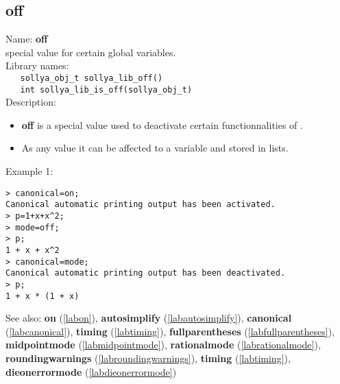 \subsection{off}
\label{laboff}
\noindent Name: \textbf{off}\\
\phantom{aaa}special value for certain global variables.\\[0.2cm]
\noindent Library names:\\
\verb|   sollya_obj_t sollya_lib_off()|\\
\verb|   int sollya_lib_is_off(sollya_obj_t)|\\[0.2cm]
\noindent Description: \begin{itemize}

\item \textbf{off} is a special value used to deactivate certain functionnalities
   of \sollya.

\item As any value it can be affected to a variable and stored in lists.
\end{itemize}
\noindent Example 1: 
\begin{center}\begin{minipage}{15cm}\begin{Verbatim}[frame=single]
> canonical=on;
Canonical automatic printing output has been activated.
> p=1+x+x^2;
> mode=off;
> p;
1 + x + x^2
> canonical=mode;
Canonical automatic printing output has been deactivated.
> p;
1 + x * (1 + x)
\end{Verbatim}
\end{minipage}\end{center}
See also: \textbf{on} (\ref{labon}), \textbf{autosimplify} (\ref{labautosimplify}), \textbf{canonical} (\ref{labcanonical}), \textbf{timing} (\ref{labtiming}), \textbf{fullparentheses} (\ref{labfullparentheses}), \textbf{midpointmode} (\ref{labmidpointmode}), \textbf{rationalmode} (\ref{labrationalmode}), \textbf{roundingwarnings} (\ref{labroundingwarnings}), \textbf{timing} (\ref{labtiming}), \textbf{dieonerrormode} (\ref{labdieonerrormode})
